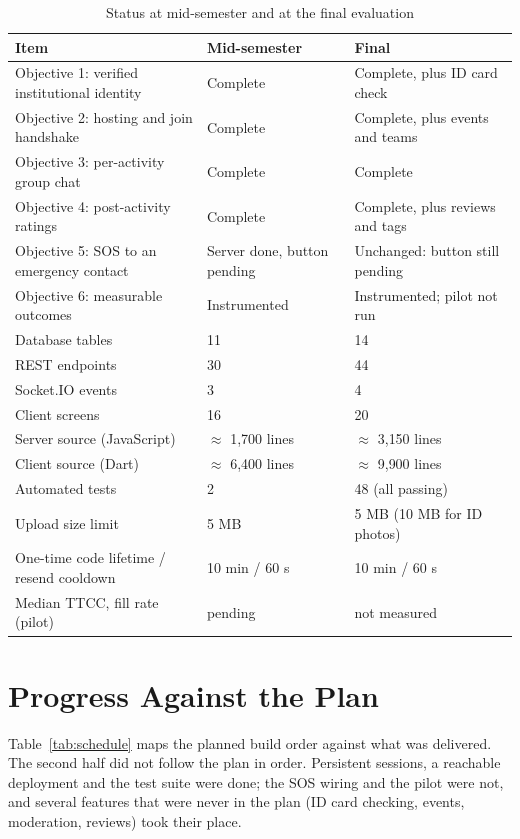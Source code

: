 \documentclass{tietreport}
\begin{document}
\begin{table}[htbp]
\centering
\begin{tabular}{|L{5.6cm}|L{2.6cm}|L{3.3cm}|}
\hline
\textbf{Item} & \textbf{Mid-semester} & \textbf{Final} \\
\hline
Objective 1: verified institutional identity & Complete & Complete, plus ID card check \\
\hline
Objective 2: hosting and join handshake & Complete & Complete, plus events and teams \\
\hline
Objective 3: per-activity group chat & Complete & Complete \\
\hline
Objective 4: post-activity ratings & Complete & Complete, plus reviews and tags \\
\hline
Objective 5: SOS to an emergency contact & Server done, button pending & Unchanged: button still pending \\
\hline
Objective 6: measurable outcomes & Instrumented & Instrumented; pilot not run \\
\hline
Database tables & 11 & 14 \\
\hline
REST endpoints & 30 & 44 \\
\hline
Socket.IO events & 3 & 4 \\
\hline
Client screens & 16 & 20 \\
\hline
Server source (JavaScript) & $\approx$ 1{,}700 lines & $\approx$ 3{,}150 lines \\
\hline
Client source (Dart) & $\approx$ 6{,}400 lines & $\approx$ 9{,}900 lines \\
\hline
Automated tests & 2 & 48 (all passing) \\
\hline
Upload size limit & 5 MB & 5 MB (10 MB for ID photos) \\
\hline
One-time code lifetime / resend cooldown & 10 min / 60 s & 10 min / 60 s \\
\hline
Median TTCC, fill rate (pilot) & pending & not measured \\
\hline
\end{tabular}
\caption{Status at mid-semester and at the final evaluation}
\label{tab:status}
\end{table}

\section{Progress Against the Plan}

Table~\ref{tab:schedule} maps the planned build order against what was delivered. The
second half did not follow the plan in order. Persistent sessions, a reachable
deployment and the test suite were done; the SOS wiring and the pilot were not, and
several features that were never in the plan (ID card checking, events, moderation,
reviews) took their place.
\end{document}
